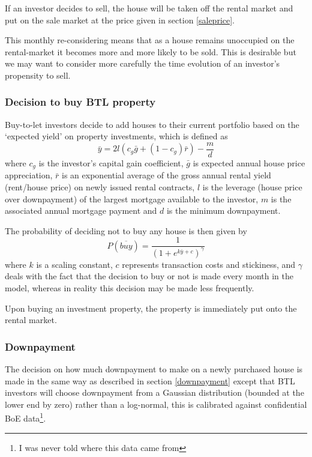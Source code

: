 \documentclass{report}
\begin{document}
If an investor decides to sell, the house will be taken off the rental market and put on the sale market at the price given in section \ref{saleprice}.

This monthly re-considering means that as a house remains unoccupied on the rental-market it becomes more and more likely to be sold. This is desirable but we may want to consider more carefully the time evolution of an investor's propensity to sell.

\subsubsection{Decision to buy BTL property}
Buy-to-let investors decide to add houses to their current portfolio based on the `expected yield' on property investments, which is defined as
\begin{equation}
\bar{y} = 2l(c_g \bar{g} + (1-c_g)\bar{r}) - \frac{m}{d} 
\end{equation}
where $c_g$ is the investor's capital gain coefficient, $\bar{g}$ is expected annual house price appreciation, $\bar{r}$ is an exponential average of the gross annual rental yield (rent/house price) on newly issued rental contracts, $l$ is the leverage (house price over downpayment) of the largest mortgage available to the investor, $m$ is the associated annual mortgage payment and $d$ is the minimum downpayment.

The probability of deciding not to buy any house is then given by
\begin{equation}
P(\overline{buy}) = \frac{1}{(1 + e^{k\bar{y}+c})^\gamma}
\end{equation}
where $k$ is a scaling constant, $c$ represents transaction costs and stickiness, and $\gamma$ deals with the fact that the decision to buy or not is made every month in the model, whereas in reality this decision may be made less frequently.

Upon buying an investment property, the property is immediately put onto the rental market.

\subsubsection{Downpayment}
The decision on how much downpayment to make on a newly purchased house is made in the same way as described in section \ref{downpayment} except that BTL investors will choose downpayment from a Gaussian distribution (bounded at the lower end by zero) rather than a log-normal, this is calibrated against confidential BoE data\footnote{I was never told where this data came from}.
\end{document}
